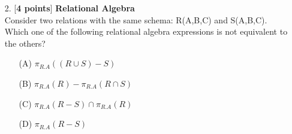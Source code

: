 \documentclass[10pt]{article}
\begin{document}
\begin{enumerate}
        \item[2.][\textbf{4 points}] \textbf{Relational Algebra} \\
        Consider two relations with the same schema: R(A,B,C) and S(A,B,C). Which one of the following relational
        algebra expressions is not equivalent to the others?
        \begin{enumerate}
            \item[(A)] $\pi_{R.A}((R\cup S)-S)$
            \item[(B)] $\pi_{R.A}(R)-\pi_{R.A}(R\cap S)$
            \item[(C)] $\pi_{R.A}(R-S)\cap \pi_{R.A}(R)$
            \item[(D)] $\pi_{R.A}(R-S)$
        \end{enumerate}
\end{enumerate}





\newpage
\end{document}
